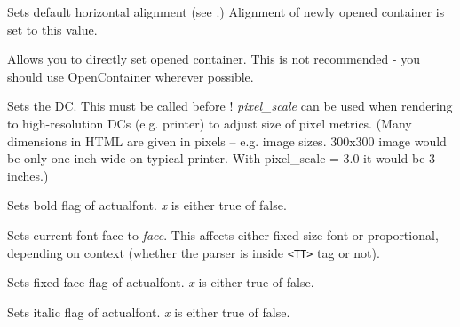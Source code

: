 Sets default horizontal alignment (see 
.)
Alignment of newly opened container is set to this value.

\label{wxhtmlwinparsersetcontainer}


Allows you to directly set opened container. This is not recommended - you should use OpenContainer
wherever possible.

\label{wxhtmlwinparsersetdc}


Sets the DC. This must be called before !
{\it pixel\_scale}  can be used when rendering to high-resolution 
DCs (e.g. printer) to adjust size of pixel metrics. (Many dimensions in 
HTML are given in pixels -- e.g. image sizes. 300x300 image would be only one
inch wide on typical printer. With pixel\_scale = 3.0 it would be 3 inches.)

\label{wxhtmlwinparsersetfontbold}


Sets bold flag of actualfont. {\it x} is either true of false.

\label{wxhtmlwinparsersetfontface}


Sets current font face to {\it face}. This affects either fixed size
font or proportional, depending on context (whether the parser is 
inside {\tt <TT>} tag or not).

\label{wxhtmlwinparsersetfontfixed}


Sets fixed face flag of actualfont. {\it x} is either true of false.

\label{wxhtmlwinparsersetfontitalic}


Sets italic flag of actualfont. {\it x} is either true of false.

